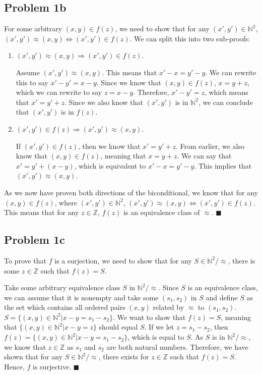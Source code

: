 \documentclass{article}
\begin{document}
\subsection{Problem 1b}

For some arbitrary $(x, y) \in f(z)$, we need to show that for any $(x', y') \in \mathbb{N}^2$, $(x', y') \approx (x,y) \iff (x', y') \in f(z)$. We can split this into two sub-proofs:

\begin{enumerate}

\item $(x', y') \approx (x, y) \Rightarrow (x', y') \in f(z)$.

Assume $(x', y') \approx (x, y)$. This means that $x' - x = y' - y$. We can rewrite this to say $x' - y' = x - y$. Since we know that $(x, y) \in f(z)$, $x = y + z$, which we can rewrite to say $z = x - y$. Therefore, $x' - y' = z$, which means that $x' = y' + z$. Since we also know that $(x', y')$ is in $\mathbb{N}^2$, we can conclude that $(x', y')$ is in $f(z)$.

\item $(x', y') \in f(z) \Rightarrow (x', y') \approx (x, y)$.

If $(x', y') \in f(z)$, then we know that $x' = y' + z$. From earlier, we also know that $(x, y) \in f(z)$, meaning that $x = y + z$. We can say that $x' = y' + (x - y)$, which is equivalent to $x' - x = y'- y$. This implies that $(x', y') \approx (x, y)$. 

\end{enumerate}

As we now have proven both directions of the biconditional, we know that for any $(x, y) \in f(z)$, where $(x', y') \in \mathbb{N}^2$, $(x', y') \approx (x, y) \iff (x', y') \in f(z)$. This means that for any $z \in \mathbb{Z}$, $f(z)$ is an equivalence class of $\approx$. $\blacksquare$

\subsection{Problem 1c}

To prove that $f$ is a surjection, we need to show that for any $S \in \mathbb{N}^2/\approx$, there is some $z \in \mathbb{Z}$ such that $f(z) = S$. 

Take some arbitrary equivalence class $S$ in $ \mathbb{N}^2/\approx$. Since $S$ is an equivalence class, we can assume that it is nonempty and take some $(s_1, s_2)$ in $S$ and define $S$ as the set which contains all ordered pairs $(x, y)$ related by $\approx$ to $(s_1, s_2)$. $S = \{(x, y) \in \mathbb{N}^2 | x - y = s_1 - s_2\}$. We want to show that $f(z) = S$, meaning that $\{(x, y) \in \mathbb{N}^2 | x - y = z\}$ should equal $S$. If we let $z = s_1 - s_2$, then $f(z) = \{(x, y) \in \mathbb{N}^2 | x - y = s_1 - s_2\}$, which is equal to $S$. As $S$ is in $ \mathbb{N}^2/\approx$, we know that $z \in \mathbb{Z}$ as $s_1$ and $s_2$ are both natural numbers. Therefore, we have shown that for any $S \in \mathbb{N}^2/\approx$, there exists for $z \in \mathbb{Z}$ such that $f(z) = S$. Hence, $f$ is surjective. $\blacksquare$
\end{document}

